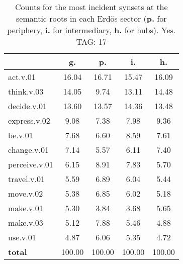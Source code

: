 \begin{table}[h!]
\begin{center}
\begin{tabular}{| l | c | c | c | c |}\hline
 & g. & p. & i. & h. \\\hline
act.v.01 & 16.04  & 16.71  & 15.47  & 16.09 \\\hline
think.v.03 & 14.05  & 9.74  & 13.11  & 14.48 \\\hline
decide.v.01 & 13.60  & 13.57  & 14.36  & 13.48 \\\hline
express.v.02 & 9.08  & 7.38  & 7.98  & 9.36 \\\hline
be.v.01 & 7.68  & 6.60  & 8.59  & 7.61 \\\hline
change.v.01 & 7.14  & 5.57  & 6.11  & 7.40 \\\hline
perceive.v.01 & 6.15  & 8.91  & 7.83  & 5.70 \\\hline
travel.v.01 & 5.59  & 6.89  & 6.04  & 5.44 \\\hline
move.v.02 & 5.38  & 6.85  & 6.02  & 5.18 \\\hline
make.v.01 & 5.30  & 3.84  & 3.68  & 5.65 \\\hline
make.v.03 & 5.12  & 7.88  & 5.46  & 4.88 \\\hline
use.v.01 & 4.87  & 6.06  & 5.35  & 4.72 \\\hline
{{\bf total}} & 100.00  & 100.00  & 100.00  & 100.00 \\\hline
\end{tabular}
\caption{Counts for the most incident synsets at the semantic roots in each Erd\"os sector ({\bf p.} for periphery, {\bf i.} for intermediary, {\bf h.} for hubs). Yes. TAG: 17}
\end{center}
\end{table}